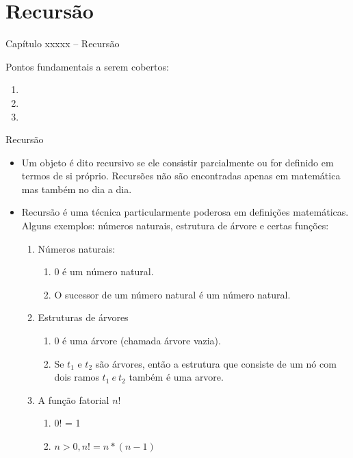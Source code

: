 
\section{Recursão}

\begin{frame}
\begin{center}
{\Large Capítulo xxxxx -- Recursão}

Pontos fundamentais a serem cobertos:

\begin{enumerate}
  \item 
  \item 
  \item 
\end{enumerate}

\end{center}

\end{frame}

\begin{frame}[fragile]{Recursão}
\begin{itemize}
	\item Um objeto é dito recursivo se ele consistir parcialmente ou for definido em termos de si próprio. Recursões não são encontradas apenas em matemática mas também no dia a dia. 
	\item Recursão é uma técnica particularmente poderosa em definições matemáticas. Alguns exemplos: números naturais, estrutura de árvore e certas funções:
	
\begin{enumerate}
	\item Números naturais:	
		\begin{enumerate}
			\item 0 é um número natural.
			\item O sucessor de um número natural é um número natural.
		\end{enumerate}
	\item Estruturas de árvores	
		\begin{enumerate}
			\item 0 é uma árvore (chamada árvore vazia).
			\item Se $t_1$ e $t_2$ são árvores, então a estrutura que consiste de um nó com dois ramos $t_1 \ e \ t_2$ também é uma arvore.			
		\end{enumerate}
	\item A função fatorial $n!$
	
\begin{enumerate}
	\item 0! = 1
	\item $n > 0, n! = n * (n - 1)$
\end{enumerate}
\end{enumerate}
\end{itemize}
\end{frame}  

